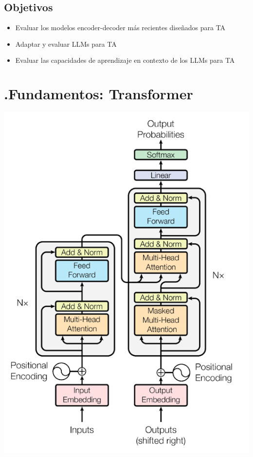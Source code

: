 \documentclass[landscape,spanish]{article}
\begin{document}
\subsection*{Objetivos}
\vspace*{5mm}
\begin{itemize}\itemsep=5mm
    \item Evaluar los modelos encoder-decoder más recientes diseñados para TA

    \item Adaptar y evaluar LLMs para TA

    \item Evaluar las capacidades de aprendizaje en contexto de los LLMs para TA

\end{itemize}

\cp %

{}
\section*{\thesection.\quad Fundamentos: Transformer}
\vspace*{10mm}






\centering
\includegraphics[width=0.4\linewidth]{transformer.png}
\end{document}
